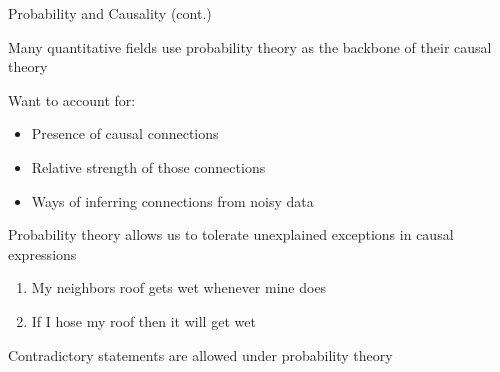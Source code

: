 \documentclass[compress, 8pt]{beamer}
\begin{document}
\begin{frame}{Probability and Causality (cont.)}

Many quantitative fields use probability theory as the backbone of their causal theory

\vspace{3ex}
Want to account for:
\begin{itemize}
    \item Presence of causal connections
    \item Relative strength of those connections
    \item Ways of inferring connections from noisy data
\end{itemize}

\vspace{3ex}
Probability theory allows us to tolerate unexplained exceptions in causal expressions
\begin{enumerate}
    \item My neighbors roof gets wet whenever mine does
    \item If I hose my roof then it will get wet
\end{enumerate}
Contradictory statements are allowed under probability theory

\end{frame}
\end{document}
